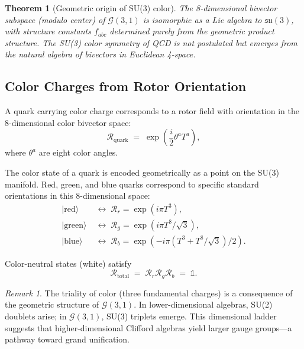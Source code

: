 \documentclass[11pt,a4paper]{article}
\newcommand{\Rotor}{\mathcal{R}}
\newcommand{\Cl}{\mathcal{G}}
\theoremstyle{definition}
\theoremstyle{plain}
\newtheorem{theorem}{Theorem}[section]
\theoremstyle{remark}
\newtheorem{remark}{Remark}[section]
\begin{document}
\begin{theorem}[Geometric origin of SU(3) color]
The 8-dimensional bivector subspace (modulo center) of $\Cl(3,1)$ is isomorphic as a Lie algebra to $\mathfrak{su}(3)$, with structure constants $f_{abc}$ determined purely from the geometric product structure. The SU(3) color symmetry of QCD is not postulated but emerges from the natural algebra of bivectors in Euclidean 4-space.
\end{theorem}

\subsection{Color Charges from Rotor Orientation}

A quark carrying color charge corresponds to a rotor field with orientation in the 8-dimensional color bivector space:
\begin{equation}
\Rotor_{\mathrm{quark}} \;=\; \exp\left(\frac{i}{2}\theta^a T^a\right),
\label{eq:quark-rotor}
\end{equation}
where $\theta^a$ are eight color angles.

The color state of a quark is encoded geometrically as a point on the SU(3) manifold. Red, green, and blue quarks correspond to specific standard orientations in this 8-dimensional space:
\begin{align}
|\mathrm{red}\rangle &\;\leftrightarrow\; \Rotor_r = \exp(i\pi T^3), \\
|\mathrm{green}\rangle &\;\leftrightarrow\; \Rotor_g = \exp(i\pi T^8/\sqrt{3}), \\
|\mathrm{blue}\rangle &\;\leftrightarrow\; \Rotor_b = \exp(-i\pi(T^3 + T^8/\sqrt{3})/2).
\end{align}

Color-neutral states (white) satisfy
\begin{equation}
\Rotor_{\mathrm{total}} \;=\; \Rotor_r \Rotor_g \Rotor_b \;=\; \mathbb{1}.
\end{equation}

\begin{remark}
The triality of color (three fundamental charges) is a consequence of the geometric structure of $\Cl(3,1)$. In lower-dimensional algebras, SU(2) doublets arise; in $\Cl(3,1)$, SU(3) triplets emerge. This dimensional ladder suggests that higher-dimensional Clifford algebras yield larger gauge groups---a pathway toward grand unification.
\end{remark}

\vspace{1em}
\end{document}
